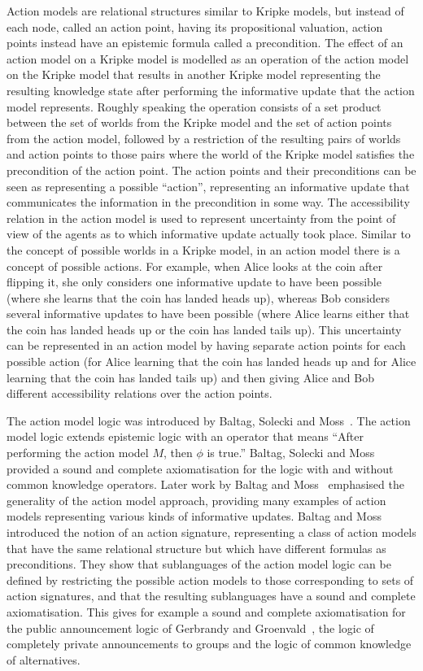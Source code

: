 Action models are relational structures similar to Kripke models, but instead of
each node, called an action point, having its propositional valuation, action
points instead have an epistemic formula called a precondition. The effect of an
action model on a Kripke model is modelled as an operation of the action model
on the Kripke model that results in another Kripke model representing the
resulting knowledge state after performing the informative update that the
action model represents. Roughly speaking the operation consists of a set
product between the set of worlds from the Kripke model and the set of action
points from the action model, followed by a restriction of the resulting pairs
of worlds and action points to those pairs where the world of the Kripke model
satisfies the precondition of the action point. The action points and their
preconditions can be seen as representing a possible ``action'', representing an
informative update that communicates the information in the precondition in some
way. The accessibility relation in the action model is used to represent
uncertainty from the point of view of the agents as to which informative update
actually took place. Similar to the concept of possible worlds in a Kripke
model, in an action model there is a concept of possible actions. For example,
when Alice looks at the coin after flipping it, she only considers one
informative update to have been possible (where she learns that the coin has
landed heads up), whereas Bob considers several informative updates to have been
possible (where Alice learns either that the coin has landed heads up or the
coin has landed tails up). This uncertainty can be represented in an action
model by having separate action points for each possible action (for Alice
learning that the coin has landed heads up and for Alice learning that the coin
has landed tails up) and then giving Alice and Bob different accessibility
relations over the action points.

The action model logic was introduced by Baltag, Solecki and
Moss~\cite{baltag:1998, baltag:1999}. The action model logic extends epistemic
logic with an operator that means ``After performing the action model $M$, then
$\phi$ is true.'' Baltag, Solecki and Moss~\cite{baltag:1998} provided a sound
and complete axiomatisation for the logic with and without common knowledge
operators. Later work by Baltag and Moss~\cite{baltag:2004} emphasised the
generality of the action model approach, providing many examples of action
models representing various kinds of informative updates. Baltag and
Moss~\cite{baltag:2004} introduced the notion of an action signature,
representing a class of action models that have the same relational structure
but which have different formulas as preconditions. They show that sublanguages
of the action model logic can be defined by restricting the possible action
models to those corresponding to sets of action signatures, and that the
resulting sublanguages have a sound and complete axiomatisation. This gives for
example a sound and complete axiomatisation for the public announcement logic of
Gerbrandy and Groenvald~\cite{gerbrandy:1997}, the logic of completely private
announcements to groups and the logic of common knowledge of alternatives.

